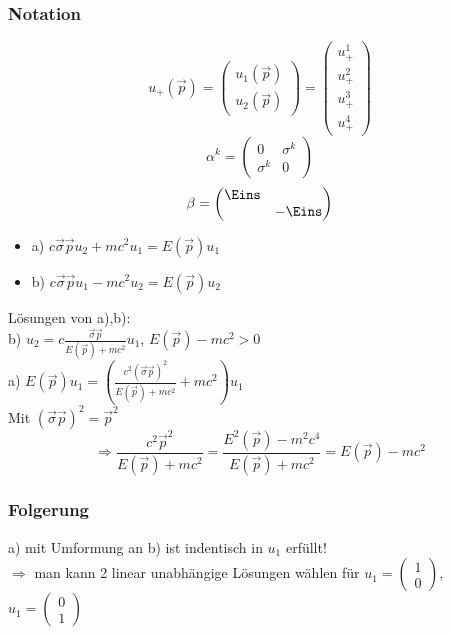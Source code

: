 \documentclass[twoside,a4paper]{scrartcl}
\renewcommand{\1}{\mathds{1}}
\newcommand{\Ra}{\Rightarrow}
\begin{document}
\subsubsection*{Notation}
$$u_+(\vec p)=\begin{pmatrix}u_1(\vec p) \\ u_2(\vec p) \end{pmatrix}=\begin{pmatrix}u^1_+ \\ u^2_+ \\ u^3_+ \\ u^4_+ \end{pmatrix}$$
$$\alpha^k=\begin{pmatrix}0 & \sigma^k \\ \sigma^k & 0 \end{pmatrix}$$
$$\beta=\begin{pmatrix}\Eins \\  & -\Eins \end{pmatrix}$$
\begin{itemize}
\item a) $c\vec \sigma \vec p u_2+mc^2 u_1=E(\vec p)u_1$
\item b) $c\vec \sigma \vec p u_1-mc^2 u_2=E(\vec p)u_2$
\end{itemize}
Lösungen von a),b):\\
b) $u_2=c\frac{\vec \sigma \vec p}{E(\vec p)+mc^2}u_1$, $ E(\vec p)-mc^2>0$\\
a) $E(\vec p)u_1=(\frac{c^2(\vec\sigma\vec p)^2}{E(\vec p)+mc^2}+mc^2)u_1$\\
Mit $(\vec \sigma \vec p)^2=\vec p^2$
$$\Ra \frac{c^2\vec p^2}{E(\vec p)+mc^2}=\frac{E^2(\vec p)-m^2c^4}{E(\vec p)+mc^2}=E(\vec p)-mc^2$$
\subsubsection*{Folgerung}
a) mit Umformung an b) ist indentisch in $u_1$ erfüllt!\\
$\Ra$ man kann 2 linear unabhängige Lösungen wählen für $u_1=\begin{pmatrix}1 \\ 0\end{pmatrix}$, $u_1=\begin{pmatrix}0 \\ 1\end{pmatrix}$
\end{document}
